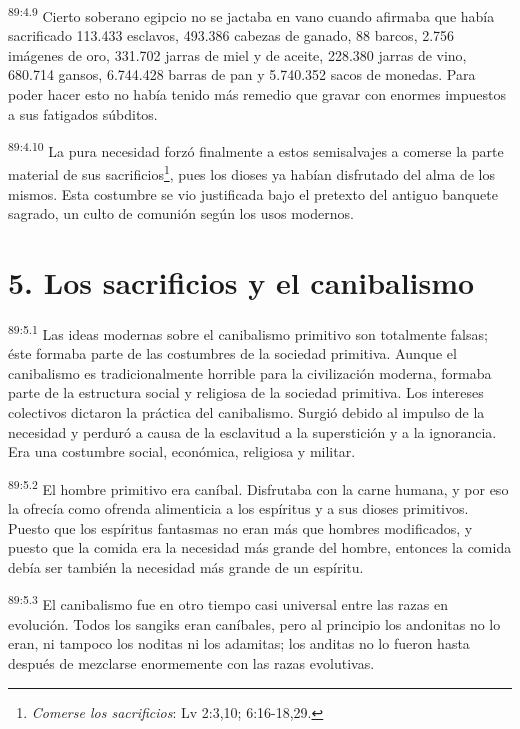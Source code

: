 \documentclass[twoside, 11pt]{book}
\begin{document}
\par
\textsuperscript{89:4.9} Cierto soberano egipcio no se jactaba en vano cuando afirmaba que había sacrificado 113.433 esclavos, 493.386 cabezas de ganado, 88 barcos, 2.756 imágenes de oro, 331.702 jarras de miel y de aceite, 228.380 jarras de vino, 680.714 gansos, 6.744.428 barras de pan y 5.740.352 sacos de monedas. Para poder hacer esto no había tenido más remedio que gravar con enormes impuestos a sus fatigados súbditos.

\par
\textsuperscript{89:4.10} La pura necesidad forzó finalmente a estos semisalvajes a comerse la parte material de sus sacrificios\footnote{\textit{Comerse los sacrificios}: Lv 2:3,10; 6:16-18,29.}, pues los dioses ya habían disfrutado del alma de los mismos. Esta costumbre se vio justificada bajo el pretexto del antiguo banquete sagrado, un culto de comunión según los usos modernos.

\section*{5. Los sacrificios y el canibalismo}
\par
\textsuperscript{89:5.1} Las ideas modernas sobre el canibalismo primitivo son totalmente falsas; éste formaba parte de las costumbres de la sociedad primitiva. Aunque el canibalismo es tradicionalmente horrible para la civilización moderna, formaba parte de la estructura social y religiosa de la sociedad primitiva. Los intereses colectivos dictaron la práctica del canibalismo. Surgió debido al impulso de la necesidad y perduró a causa de la esclavitud a la superstición y a la ignorancia. Era una costumbre social, económica, religiosa y militar.

\par
\textsuperscript{89:5.2} El hombre primitivo era caníbal. Disfrutaba con la carne humana, y por eso la ofrecía como ofrenda alimenticia a los espíritus y a sus dioses primitivos. Puesto que los espíritus fantasmas no eran más que hombres modificados, y puesto que la comida era la necesidad más grande del hombre, entonces la comida debía ser también la necesidad más grande de un espíritu.

\par
\textsuperscript{89:5.3} El canibalismo fue en otro tiempo casi universal entre las razas en evolución. Todos los sangiks eran caníbales, pero al principio los andonitas no lo eran, ni tampoco los noditas ni los adamitas; los anditas no lo fueron hasta después de mezclarse enormemente con las razas evolutivas.
\end{document}
